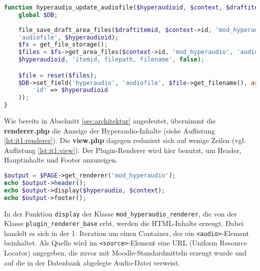 \begin{lstlisting}[language=php,
             linewidth=\textwidth,
             caption={Ausschnitt der \textbf{locallib.php} in der 1. Iteration},
             label={lst:it1:locallib}]
function hyperaudio_update_audiofile($hyperaudioid, $context, $draftitemid) {
    global $DB;
    
    file_save_draft_area_files($draftitemid, $context->id, 'mod_hyperaudio',
    'audiofile', $hyperaudioid);
    $fs = get_file_storage();
    $files = $fs->get_area_files($context->id, 'mod_hyperaudio', 'audiofile',
    $hyperaudioid, 'itemid, filepath, filename', false);

    $file = reset($files);
    $DB->set_field('hyperaudio', 'audiofile', $file->get_filename(), array(
        'id' => $hyperaudioid
    ));
}
\end{lstlisting}

Wie bereits in Abschnitt \ref{sec:architektur} angedeutet, übernimmt die \textbf{renderer.php} die Anzeige der Hyperaudio-Inhalte (siehe Auflistung \ref{lst:it1:renderer}). Die \textbf{view.php} dagegen reduziert sich auf wenige Zeilen (vgl. Auflistung \ref{lst:it1:view}). Der Plugin-Renderer wird hier benutzt, um Header, Hauptinhalte und Footer anzuzeigen.

\begin{lstlisting}[language=php,
deletekeywords={header},
             linewidth=\textwidth,
             caption={Ausschnitt der \textbf{view.php} in der 1. Iteration},
             label={lst:it1:view}]
$output = $PAGE->get_renderer('mod_hyperaudio');
echo $output->header();
echo $output->display($hyperaudio, $context);
echo $output->footer();
\end{lstlisting}

In der Funktion \texttt{display} der Klasse \mbox{\texttt{mod_hyperaudio_renderer}}, die von der Klasse \mbox{\texttt{plugin_renderer_base}} erbt, werden die HTML-Inhalte erzeugt. Dabei handelt es sich in der 1. Iteration um einen Container, der ein \texttt{<audio>}-Element beinhaltet. Als Quelle wird im \texttt{<source>}-Element eine URL (Uniform Resource Locator) angegeben, die zuvor mit Moodle-Standardmitteln erzeugt wurde und auf die in der Datenbank abgelegte Audio-Datei verweist.

